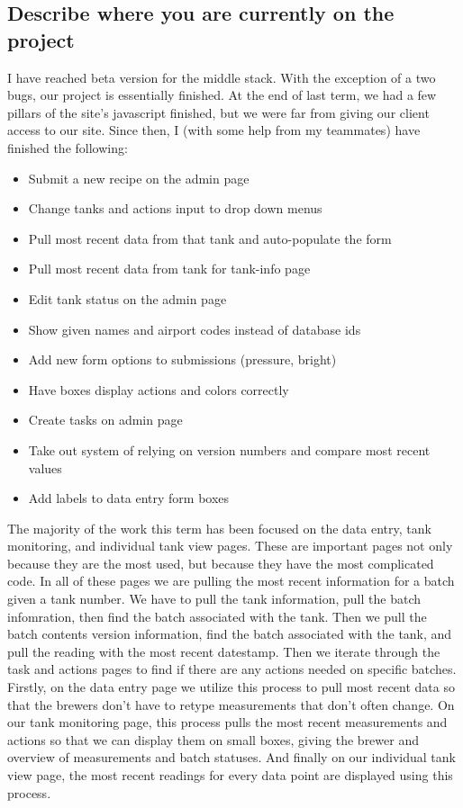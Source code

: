 \documentclass[draftclsnofoot,onecolumn,letterpaper,10pt,compsoc]{IEEEtran}
\begin{document}
\subsection{Describe where you are currently on the project}
I have reached beta version for the middle stack.
With the exception of a two bugs, our project is essentially finished.
At the end of last term, we had a few pillars of the site's javascript finished, but we were far from giving our client access to our site.
Since then, I (with some help from my teammates) have finished the following:
\begin{itemize}
\item Submit a new recipe on the admin page
\item Change tanks and actions input to drop down menus
\item Pull most recent data from that tank and auto-populate the form
\item Pull most recent data from tank for tank-info page
\item Edit tank status on the admin page
\item Show given names and airport codes instead of database ids
\item Add new form options to submissions (pressure, bright)
\item Have boxes display actions and colors correctly
\item Create tasks on admin page
\item Take out system of relying on version numbers and compare most recent values
\item Add labels to data entry form boxes
\end{itemize}
The majority of the work this term has been focused on the data entry, tank monitoring, and individual tank view pages.
These are important pages not only because they are the most used, but because they have the most complicated code.
In all of these pages we are pulling the most recent information for a batch given a tank number.
We have to pull the tank information, pull the batch infomration, then find the batch associated with the tank.
Then we pull the batch contents version information, find the batch associated with the tank, and pull the reading with the most recent datestamp.
Then we iterate through the task and actions pages to find if there are any actions needed on specific batches.
\\
Firstly, on the data entry page we utilize this process to pull most recent data so that the brewers don't have to retype measurements that don't often change.
On our tank monitoring page, this process pulls the most recent measurements and actions so that we can display them on small boxes, giving the brewer and overview of measurements and batch statuses.
And finally on our individual tank view page, the most recent readings for every data point are displayed using this process.
\\
\end{document}
